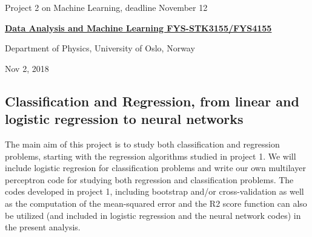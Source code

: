 \documentclass[%
oneside,                 %
final,                   %
10pt]{article}
\begin{document}

\newcommand{\exercisesection}[1]{\subsection*{#1}}






\thispagestyle{empty}

\begin{center}
{\LARGE\bf
\begin{spacing}{1.25}
Project 2 on Machine Learning, deadline November 12
\end{spacing}
}
\end{center}


\begin{center}
{\bf \href{{http://www.uio.no/studier/emner/matnat/fys/FYS3155/index-eng.html}}{Data Analysis and Machine Learning FYS-STK3155/FYS4155}}
\end{center}

    \begin{center}
\centerline{{\small Department of Physics, University of Oslo, Norway}}
\end{center}
    

\begin{center}
Nov 2, 2018
\end{center}

\vspace{1cm}


\subsection{Classification and Regression, from linear and logistic regression to neural networks}

The main aim of this project is to study both classification and
regression problems, starting with the regression algorithms studied
in project 1. We will include logistic regresion for classification
problems and write our own multilayer perceptron code for studying
both regression and classification problems.  The codes developed in
project 1, including bootstrap and/or cross-validation as well as the
computation of the mean-squared error and the R2 score function can
also be utilized (and included in logistic regression and the neural
network codes) in the present analysis.
\end{document}
